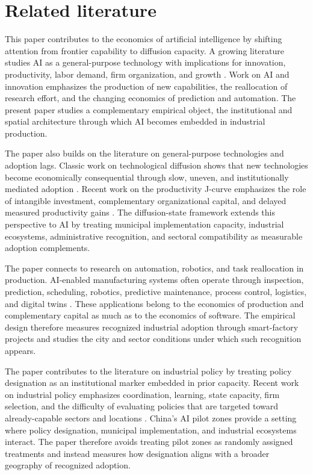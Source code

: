 \documentclass[12pt]{article}
\begin{document}
\section{Related literature}
\label{sec:literature}

This paper contributes to the economics of artificial intelligence by shifting attention from frontier capability to diffusion capacity. A growing literature studies AI as a general-purpose technology with implications for innovation, productivity, labor demand, firm organization, and growth \citep{agrawal2019economics,jones2021ai,acemoglu2014robots}. Work on AI and innovation emphasizes the production of new capabilities, the reallocation of research effort, and the changing economics of prediction and automation. The present paper studies a complementary empirical object, the institutional and spatial architecture through which AI becomes embedded in industrial production.

The paper also builds on the literature on general-purpose technologies and adoption lags. Classic work on technological diffusion shows that new technologies become economically consequential through slow, uneven, and institutionally mediated adoption \citep{bresnahan1995general,comin2010exploration,rogers2003diffusion}. Recent work on the productivity J-curve emphasizes the role of intangible investment, complementary organizational capital, and delayed measured productivity gains \citep{brynjolfsson2021productivity}. The diffusion-state framework extends this perspective to AI by treating municipal implementation capacity, industrial ecosystems, administrative recognition, and sectoral compatibility as measurable adoption complements.

The paper connects to research on automation, robotics, and task reallocation in production. AI-enabled manufacturing systems often operate through inspection, prediction, scheduling, robotics, predictive maintenance, process control, logistics, and digital twins \citep{ifr2023worldrobotics}. These applications belong to the economics of production and complementary capital as much as to the economics of software. The empirical design therefore measures recognized industrial adoption through smart-factory projects and studies the city and sector conditions under which such recognition appears.

The paper contributes to the literature on industrial policy by treating policy designation as an institutional marker embedded in prior capacity. Recent work on industrial policy emphasizes coordination, learning, state capacity, firm selection, and the difficulty of evaluating policies that are targeted toward already-capable sectors and locations \citep{juhasz2024industrial,rodrik2004industrial,aghion2015industrial}. China's AI pilot zones provide a setting where policy designation, municipal implementation, and industrial ecosystems interact. The paper therefore avoids treating pilot zones as randomly assigned treatments and instead measures how designation aligns with a broader geography of recognized adoption.
\end{document}
